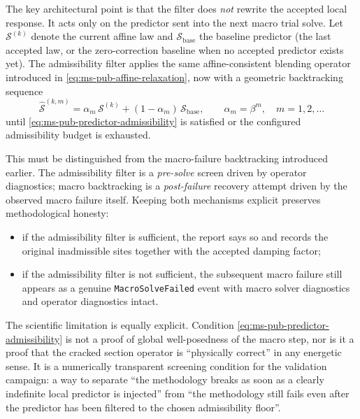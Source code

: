 The key architectural point is that the filter does \emph{not} rewrite the
accepted local response.  It acts only on the predictor sent into the next
macro trial solve.  Let \(\mathcal{S}^{(k)}\) denote the current affine law
and \(\mathcal{S}_{\mathrm{base}}\) the baseline predictor (the last accepted
law, or the zero-correction baseline when no accepted predictor exists yet).
The admissibility filter applies the same affine-consistent blending operator
introduced in \eqref{eq:ms-pub-affine-relaxation}, now with a geometric
backtracking sequence
\begin{equation}
  \widehat{\mathcal{S}}^{(k,m)}
  =
  \alpha_m\,\mathcal{S}^{(k)}
  + (1-\alpha_m)\,\mathcal{S}_{\mathrm{base}},
  \qquad
  \alpha_m = \beta^m,
  \quad
  m = 1,2,\dots
  \label{eq:ms-pub-predictor-admissibility-backtracking}
\end{equation}
until \eqref{eq:ms-pub-predictor-admissibility} is satisfied or the
configured admissibility budget is exhausted.

This must be distinguished from the macro-failure backtracking introduced
earlier.  The admissibility filter is a \emph{pre-solve} screen driven by
operator diagnostics; macro backtracking is a \emph{post-failure} recovery
attempt driven by the observed macro failure itself.  Keeping both mechanisms
explicit preserves methodological honesty:
\begin{itemize}
  \item if the admissibility filter is sufficient, the report says so and
    records the original inadmissible sites together with the accepted
    damping factor;
  \item if the admissibility filter is not sufficient, the subsequent macro
    failure still appears as a genuine \texttt{MacroSolveFailed} event with
    macro solver diagnostics and operator diagnostics intact.
\end{itemize}

The scientific limitation is equally explicit.  Condition
\eqref{eq:ms-pub-predictor-admissibility} is not a proof of global
well-posedness of the macro step, nor is it a proof that the cracked section
operator is ``physically correct'' in any energetic sense.  It is a
numerically transparent screening condition for the validation campaign: a
way to separate ``the methodology breaks as soon as a clearly indefinite local
predictor is injected'' from ``the methodology still fails even after the
predictor has been filtered to the chosen admissibility floor''.

